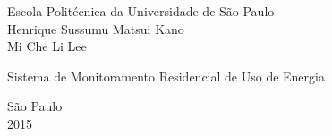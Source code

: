 \begin{titlepage}

\begin{center}
\vspace{30mm}
\Huge
Escola Politécnica da Universidade de São Paulo\\
Henrique Sussumu Matsui Kano\\
Mi Che Li Lee

\vspace{90mm}
\Large
Sistema de Monitoramento Residencial de Uso de Energia

\vfill
São Paulo\\
2015

\end{center}

\end{titlepage}

